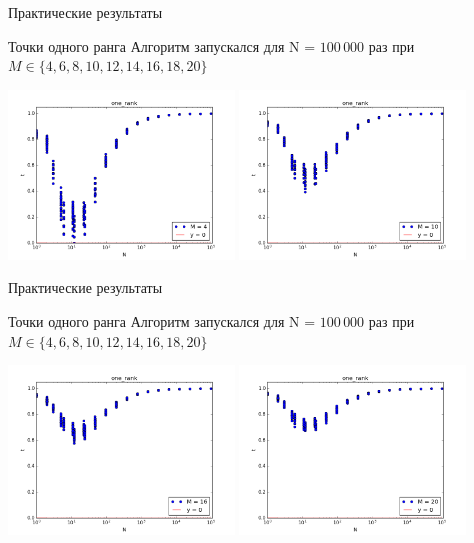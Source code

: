 \documentclass{beamer}
\begin{document}
\begin{frame}{Практические результаты}
\begin{block}{Точки одного ранга}
Алгоритм запускался для N = $100\,000$ раз при $M \in \{4, 6, 8, 10, 12, 14, 16, 18, 20\}$
\begin{table}[h]
\begin{center}
\includegraphics[width=6cm]{pic/one_rank_m=4}
\includegraphics[width=6cm]{pic/one_rank_m=10}
\end{center}
\end{table}
\end{block}
\end{frame}

\begin{frame}{Практические результаты}
\begin{block}{Точки одного ранга}
Алгоритм запускался для N = $100\,000$ раз при $M \in \{4, 6, 8, 10, 12, 14, 16, 18, 20\}$
\begin{table}[h]
\begin{center}
\includegraphics[width=6cm]{pic/one_rank_m=16}
\includegraphics[width=6cm]{pic/one_rank_m=20}
\end{center}
\end{table}
\end{block}
\end{frame}
\end{document}
